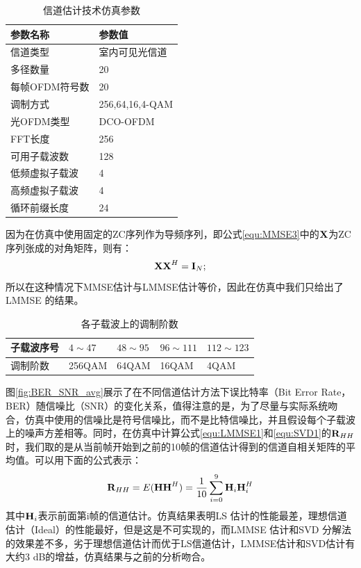 \begin{table}[ht]
    \caption{信道估计技术仿真参数}
    \label{tab:Signle Color Channel Estimation Paramters}
    \centering
    \begin{tabular}{ll}
        \toprule
        参数名称                & 参数值\\
        \midrule
        信道类型                & 室内可见光信道\\
        多径数量                & 20 \\
        每帧OFDM符号数        & 20 \\
        调制方式                & 256,64,16,4-QAM\\
        光OFDM类型              & DCO-OFDM\\
        FFT长度                 & 256 \\
        可用子载波数            & 128 \\
        低频虚拟子载波          & 4  \\
        高频虚拟子载波          & 4  \\
        循环前缀长度            & 24 \\
        \bottomrule
    \end{tabular}
\end{table}
因为在仿真中使用固定的ZC序列作为导频序列，即公式\ref{equ:MMSE3}中的$\textbf X$为ZC序列张成的对角矩阵，则有：
\begin{equation}
\textbf X \textbf X^H = \textbf I_N;
\end{equation}
所以在这种情况下MMSE估计与LMMSE估计等价，因此在仿真中我们只给出了LMMSE 的结果。

\begin{table}[ht]
    \caption{各子载波上的调制阶数}
    \label{tab:modOrder}
    \centering
    \begin{tabular}{lllll}
        \toprule
        子载波序号    & $4\sim47$  & $48\sim95$  & $96\sim111$ & $112\sim123$ \\
        \midrule
        调制阶数      & 256QAM  & 64QAM  &16QAM & 4QAM    \\
        \bottomrule
    \end{tabular}
\end{table}
图\ref{fig:BER_SNR_avg}展示了在不同信道估计方法下误比特率（Bit Error Rate，BER）随信噪比（SNR）的变化关系，值得注意的是，为了尽量与实际系统吻合，仿真中使用的信噪比是符号信噪比，而不是比特信噪比，并且假设每个子载波上的噪声方差相等。同时，在仿真中计算公式\ref{equ:LMMSE1}和\ref{equ:SVD1}的$\textbf R_{HH}$时，我们取的是从当前帧开始到之前的10帧的信道估计得到的信道自相关矩阵的平均值。可以用下面的公式表示：
\begin{equation}
\textbf R_{HH} = E(\textbf H \textbf H^H)=\frac{1}{10}\sum_{i=0}^{9}\textbf H_i \textbf H_i^H
\end{equation}
其中$\textbf H_i$表示前面第i帧的信道估计。仿真结果表明LS 估计的性能最差，理想信道估计（Ideal）的性能最好，但是这是不可实现的，而LMMSE 估计和SVD 分解法的效果差不多，劣于理想信道估计而优于LS信道估计，LMMSE估计和SVD估计有大约3 dB的增益，仿真结果与之前的分析吻合。

